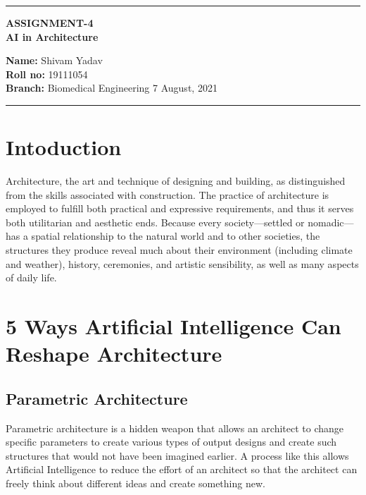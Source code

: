 \documentclass[10pt,a4paper,twoside]{article}
\begin{document}
\begin{center}
\hrule

\vspace{.4cm}
{\bf {\Large ASSIGNMENT-4}}\\
\vspace{.3cm}
{\bf {\huge AI in Architecture  }}
\vspace{.3cm}
\end{center}
{\bf Name:}  Shivam Yadav\\
{\bf Roll no:}  19111054 \\
{\bf Branch: }  Biomedical Engineering \hspace{\fill}  7 August, 2021 \\
\hrule

\vspace{.5cm}






\section{Intoduction}

Architecture, the art and technique of designing and building, as distinguished from the skills associated with construction. The practice of architecture is employed to fulfill both practical and expressive requirements, and thus it serves both utilitarian and aesthetic ends. Because every society—settled or nomadic—has a spatial relationship to the natural world and to other societies, the structures they produce reveal much about their environment (including climate and weather), history, ceremonies, and artistic sensibility, as well as many aspects of daily life.


\section{5 Ways Artificial Intelligence Can Reshape Architecture   }
\subsection{      Parametric Architecture      }

Parametric architecture is a hidden weapon that allows an architect to change specific parameters to create various types of output designs and create such structures that would not have been imagined earlier. A process like this allows Artificial Intelligence to reduce the effort of an architect so that the architect can freely think about different ideas and create something new.
\end{document}
